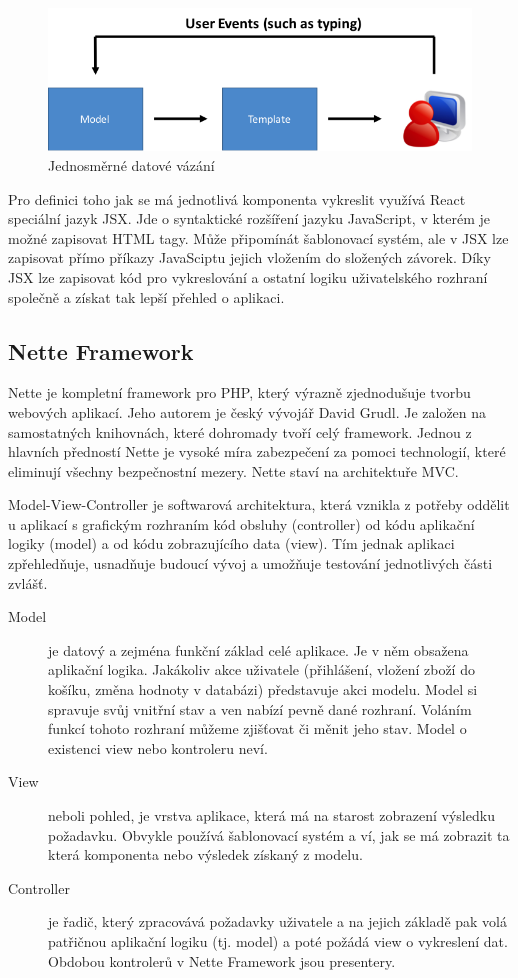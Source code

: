 \documentclass[thesis=B,czech]{FITthesis}[2012/06/26]
\begin{document}
	\begin{figure}
		\includegraphics[width=\textwidth]{databinding2.png}
		\caption{Jednosměrné datové vázání}\label{data_binding}
	\end{figure}

	Pro definici toho jak se má jednotlivá komponenta vykreslit využívá React speciální jazyk JSX. Jde o syntaktické rozšíření jazyku JavaScript, v kterém 	je možné zapisovat HTML tagy. Může připomínát šablonovací systém, ale v JSX lze zapisovat přímo příkazy JavaSciptu jejich vložením do složených závorek. Díky JSX lze zapisovat kód pro vykreslování a ostatní logiku uživatelského rozhraní společně a získat tak lepší přehled o aplikaci.\cite{jsx} 
	
\subsection{Nette Framework}
	Nette\cite{nette} je kompletní framework pro PHP, který výrazně zjednodušuje tvorbu webových aplikací. Jeho autorem je český vývojář David Grudl. Je založen na samostatných knihovnách, které dohromady tvoří celý framework. Jednou z hlavních předností Nette je vysoké míra zabezpečení za pomoci technologií, které eliminují všechny bezpečnostní mezery. Nette staví na architektuře MVC.
	
	Model-View-Controller je softwarová architektura, která vznikla z potřeby oddělit u aplikací s grafickým rozhraním kód obsluhy (controller) od kódu aplikační logiky (model) a od kódu zobrazujícího data (view). Tím jednak aplikaci zpřehledňuje, usnadňuje budoucí vývoj a umožňuje testování jednotlivých části zvlášť.
	
	\begin{description}
		\item[Model] je datový a zejména funkční základ celé aplikace. Je v něm obsažena aplikační logika. Jakákoliv akce uživatele (přihlášení, vložení zboží do košíku, změna hodnoty v databázi) představuje akci modelu. Model si spravuje svůj vnitřní stav a ven nabízí pevně dané rozhraní. Voláním funkcí tohoto rozhraní můžeme zjišťovat či měnit jeho stav. Model o existenci view nebo kontroleru neví.
		\item[View] neboli pohled, je vrstva aplikace, která má na starost zobrazení výsledku požadavku. Obvykle používá šablonovací systém a ví, jak se má zobrazit ta která komponenta nebo výsledek získaný z modelu.
		\item[Controller]je řadič, který zpracovává požadavky uživatele a na jejich základě pak volá patřičnou aplikační logiku (tj. model) a poté požádá view o vykreslení dat. Obdobou kontrolerů v Nette Framework jsou presentery.\cite{nette_mvc}
	\end{description}
\end{document}
